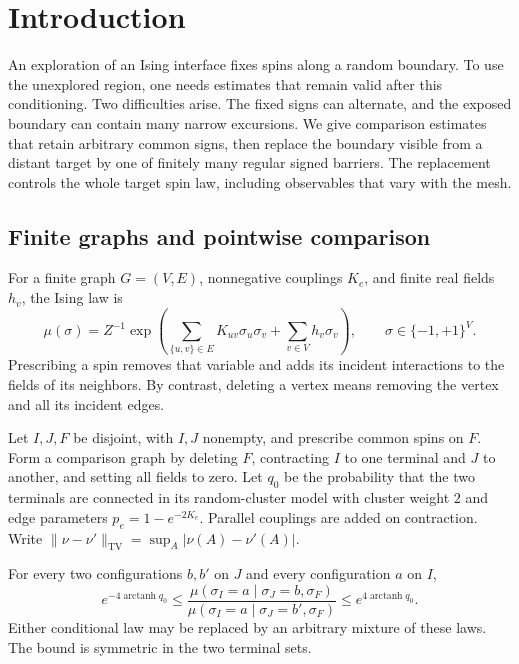 \section{Introduction}\label{in:section}

An exploration of an Ising interface fixes spins along a random boundary.
To use the unexplored region, one needs estimates that remain valid after
this conditioning. Two difficulties arise. The fixed signs can alternate,
and the exposed boundary can contain many narrow excursions. We give
comparison estimates that retain arbitrary common signs, then replace
the boundary visible from a distant target by one of finitely many
regular signed barriers. The replacement controls the whole target
spin law, including observables that vary with the mesh.

\subsection{Finite graphs and pointwise comparison}
For a finite graph $G=(V,E)$, nonnegative couplings $K_e$, and finite real
fields $h_v$, the Ising law is
\[
 \mu(\sigma)=Z^{-1}\exp\!\left(
   \sum_{\{u,v\}\in E}K_{uv}\sigma_u\sigma_v
       +\sum_{v\in V}h_v\sigma_v\right),
 \qquad \sigma\in\{-1,+1\}^{V}.
\]
Prescribing a spin removes that variable and adds its incident
interactions to the fields of its neighbors. By contrast, deleting a
vertex means removing the vertex and all its incident edges.

Let $I,J,F$ be disjoint, with $I,J$ nonempty, and prescribe common spins
on $F$. Form a comparison graph by deleting $F$, contracting $I$ to one
terminal and $J$ to another, and setting all fields to zero. Let $q_0$
be the probability that the two terminals are connected in its
random-cluster model with cluster weight $2$ and edge parameters
$p_e=1-e^{-2K_e}$. Parallel couplings are added on contraction. Write
$\|\nu-\nu'\|_{\mathrm{TV}}=\sup_A|\nu(A)-\nu'(A)|$.

\begin{theorem}\label{in:comparison}
For every two configurations $b,b'$ on $J$ and every configuration $a$
on $I$,
\[
 e^{-4\operatorname{arctanh}q_0}
 \leq
 \frac{\mu(\sigma_I=a\mid\sigma_J=b,\sigma_F)}
      {\mu(\sigma_I=a\mid\sigma_J=b',\sigma_F)}
 \leq e^{4\operatorname{arctanh}q_0}.
\]
Either conditional law may be replaced by an arbitrary mixture of
these laws. The bound is symmetric in the two terminal sets.
\end{theorem}

